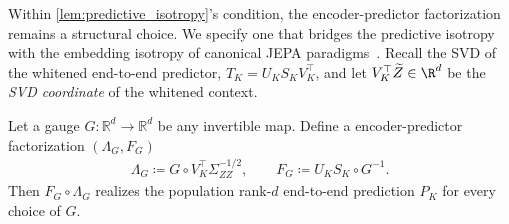 

Within \cref{lem:predictive_isotropy}'s condition, the encoder-predictor factorization remains a structural choice. 
We specify one that bridges the predictive isotropy with the embedding isotropy of canonical JEPA paradigms~\citep{balestriero2025lejepa}.
Recall the SVD of the whitened end-to-end predictor, $T_K = U_K S_K V_K^\top$, and let $V_K^\top \widetilde Z \in \R^d$ be the \emph{SVD coordinate} of the whitened context.

\begin{lemma}
\label{lem:gauge_invariance}
Let a gauge $G : \mathbb{R}^d \to \mathbb{R}^d$ be any invertible map. 
Define a encoder-predictor factorization $(\Lambda_G, F_G)$
\begin{align*}
\Lambda_G \coloneqq G \circ V_K^\top \Sigma_{ZZ}^{-1/2}, \qquad
F_G \coloneqq U_K S_K \circ G^{-1}.
\end{align*}
Then $F_G \circ \Lambda_G$ realizes the population rank-$d$ end-to-end prediction $P_K$ for every choice of $G$.
\end{lemma}

